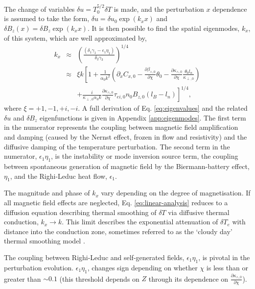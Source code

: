 \documentclass[aip,reprint]{revtex4-1}
\begin{document}
 The change of variables $\delta u= T_0^{5/2}\delta T$ is made, and the perturbation $x$ dependence is assumed to take the form, $\delta u = \delta u_0 \exp(k_x x)$ and $\delta B_z(x) = \delta B_z \exp(k_x x)$.  It is then possible to find the spatial eigenmodes, $k_x$, of this system, which are well approximated by,
\begin{eqnarray}
k_x &\approx& \left(\frac{(\delta_1 \gamma_1 - \epsilon_1 \eta_1)}{\delta_2 \gamma_3}\right)^{1/4} \nonumber\\
&\approx& \xi k \left[ 1 + \frac{1}{\alpha_0 k^2}\left(\partial_x C_{x,0} - \frac{\partial \beta_{\wedge,0}}{\partial \chi} \theta_0  -\frac{\partial \kappa_{\wedge,0}}{\partial \chi}  \frac{\theta_0 l_n}{ \kappa_{\perp,0}} \right)\right.  \nonumber\\
&  & \left. +\frac{i}{\kappa_{\perp,0}\alpha_{0} k}  \frac{\partial \kappa_{\wedge,0}}{\partial \chi} \tau_{ei,0} n_0 B_{z,0}\left( l_B - l_n \right) \right]^{1/4},
\label{eq:eigenvalues}
\end{eqnarray}
where $\xi = +1, -1, +i, -i$. A full derivation of Eq. \ref{eq:eigenvalues} and the related $\delta u$ and $\delta B_z$ eigenfunctions is given in Appendix \ref{app:eigenmodes}. The first term in the numerator represents the coupling between magnetic field amplification and damping (caused by the  Nernst effect, frozen in flow and resistivity) and the diffusive damping of the temperature perturbation. The second term in the numerator, $\epsilon_1 \eta_1$,  is the instability or mode inversion source term, the coupling between spontaneous generation of magnetic field by the Biermann-battery effect, $\eta_1$, and the Righi-Leduc heat flow, $\epsilon_1$. 


The magnitude and phase of $k_x$ vary depending on the degree of magnetisation. 
If all magnetic field effects are neglected, Eq. \ref{eq:linear-analysis} reduces to a diffusion equation describing thermal smoothing of $\delta T$ via diffusive thermal conduction, $k_x \rightarrow k$. This limit describes the exponential attenuation of $\delta T_e$ with distance into the conduction zone, sometimes referred to as the `cloudy day' thermal smoothing model  \cite{Nuckolls1972,Goncharov2006}. 

The coupling between Righi-Leduc and self-generated fields, $\epsilon_1 \eta_1 $, is pivotal in the perturbation evolution. $\epsilon_1 \eta_1$, changes sign depending on whether $\chi$ is less than or greater than $\sim 0.1$ (this threshold depends on $Z$ through its dependence  on $\frac{\partial \kappa_{\wedge,0}}{\partial \chi}$). 
\end{document}
